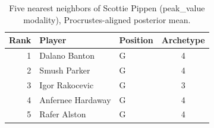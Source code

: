 \begin{table}[htbp]
  \centering\small
  \begin{tabular}{rllc}
    \toprule
    Rank & Player & Position & Archetype \\
    \midrule
    1 & Dalano Banton & G & 4 \\
    2 & Smush Parker & G & 4 \\
    3 & Igor Rakocevic & G & 3 \\
    4 & Anfernee Hardaway & G & 4 \\
    5 & Rafer Alston & G & 4 \\
    \bottomrule
  \end{tabular}
  \caption{Five nearest neighbors of Scottie Pippen (peak_value modality), Procrustes-aligned posterior mean.}
  \label{tab:Scottie_Pippen_neighbors_peak_value}
\end{table}

